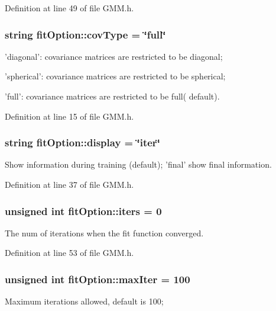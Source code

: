 Definition at line 49 of file G\+M\+M.\+h.

\hypertarget{structfit_option_ae1d880f6fcd26e15f07d50c77c5cceea}{
\subsubsection[{cov\+Type}]{\setlength{\rightskip}{0pt plus 5cm}string fit\+Option\+::cov\+Type = \char`\"{}full\char`\"{}}}\label{structfit_option_ae1d880f6fcd26e15f07d50c77c5cceea}
'diagonal'\+: covariance matrices are restricted to be diagonal;

'spherical'\+: covariance matrices are restricted to be spherical;

'full'\+: covariance matrices are restricted to be full( default). 

Definition at line 15 of file G\+M\+M.\+h.

\hypertarget{structfit_option_acd949efbbb51ddf447d4cb86fd2ac901}{
\subsubsection[{display}]{\setlength{\rightskip}{0pt plus 5cm}string fit\+Option\+::display = \char`\"{}iter\char`\"{}}}\label{structfit_option_acd949efbbb51ddf447d4cb86fd2ac901}
Show information during training (default); 'final' show final information. 

Definition at line 37 of file G\+M\+M.\+h.

\hypertarget{structfit_option_a711048d488fccee5740b31e4149c46de}{
\subsubsection[{iters}]{\setlength{\rightskip}{0pt plus 5cm}unsigned int fit\+Option\+::iters = 0}}\label{structfit_option_a711048d488fccee5740b31e4149c46de}
The num of iterations when the fit function converged. 

Definition at line 53 of file G\+M\+M.\+h.

\hypertarget{structfit_option_a54d1906ece53c348047c8b404ff06053}{
\subsubsection[{max\+Iter}]{\setlength{\rightskip}{0pt plus 5cm}unsigned int fit\+Option\+::max\+Iter = 100}}\label{structfit_option_a54d1906ece53c348047c8b404ff06053}
Maximum iterations allowed, default is 100; 

